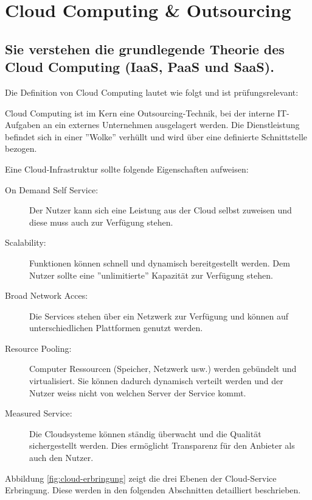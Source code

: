 \chapter{Cloud Computing \& Outsourcing}

\section{Sie verstehen die grundlegende Theorie des Cloud Computing (IaaS, PaaS und SaaS).}

Die Definition von Cloud Computing lautet wie folgt und ist prüfungsrelevant:

Cloud Computing ist im Kern eine Outsourcing-Technik, bei der interne IT-Aufgaben an ein externes Unternehmen ausgelagert werden. Die Dienstleistung befindet sich in einer ''Wolke'' verhüllt und wird über eine definierte Schnittstelle bezogen.

Eine Cloud-Infrastruktur sollte folgende Eigenschaften aufweisen:
\begin{description}
	\item[On Demand Self Service:] Der Nutzer kann sich eine Leistung aus der Cloud selbst zuweisen und diese muss auch zur Verfügung stehen.
	\item[Scalability:] Funktionen können schnell und dynamisch bereitgestellt werden. Dem Nutzer sollte eine ''unlimitierte'' Kapazität zur Verfügung stehen.
	\item[Broad Network Acces:] Die Services stehen über ein Netzwerk zur Verfügung und können auf unterschiedlichen Plattformen genutzt werden.
	\item[Resource Pooling:] Computer Ressourcen (Speicher, Netzwerk usw.) werden gebündelt und virtualisiert. Sie können dadurch dynamisch verteilt werden und der Nutzer weiss nicht von welchen Server der Service kommt.
	\item[Measured Service:] Die Cloudsysteme können ständig überwacht und die Qualität sichergestellt werden. Dies ermöglicht Transparenz für den Anbieter als auch den Nutzer.
\end{description}

Abbildung \ref{fig:cloud-erbringung} zeigt die drei Ebenen der Cloud-Service Erbringung. Diese werden in den folgenden Abschnitten detailliert beschrieben. 

